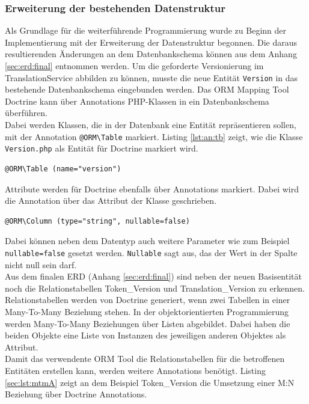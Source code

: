 \documentclass[10pt, oneside, ngerman]{article}
\begin{document}
  \subsubsection{Erweiterung der bestehenden Datenstruktur}\label{sec:impl:db}
    Als Grundlage für die weiterführende Programmierung wurde zu Beginn der Implementierung mit der Erweiterung der Datenstruktur begonnen. Die daraus resultierenden Änderungen an dem Datenbankschema können aus dem 
    Anhang \ref{sec:erd:final} entnommen werden.
    Um die geforderte Versionierung im TranslationService abbilden zu können, musste die neue Entität \lstinline{Version} in das bestehende Datenbankschema eingebunden werden.
    Das ORM Mapping Tool Doctrine kann über Annotations PHP-Klassen in ein Datenbankschema überführen.\\
    Dabei werden Klassen, die in der Datenbank eine Entität repräsentieren sollen, mit der Annotation \lstinline{@ORM\Table} markiert.
    Listing \ref{lst:an:tb} zeigt, wie die Klasse \lstinline{Version.php} als Entität für Doctrine markiert wird.
    \begin{lstlisting}[caption={Annotation für eine Entität},captionpos=b, label= lst:an:tb]
      @ORM\Table (name="version")
    \end{lstlisting}
    Attribute werden für Doctrine ebenfalls über Annotations markiert. Dabei wird die Annotation über das Attribut der Klasse geschrieben.
    \begin{lstlisting}[caption={Annotation für ein Attribut},captionpos=b, label= lst:an:at]
      @ORM\Column (type="string", nullable=false)
    \end{lstlisting} 
    Dabei können neben dem Datentyp auch weitere Parameter wie zum Beispiel \lstinline{nullable=false} gesetzt werden. \lstinline{Nullable} sagt aus, das der Wert in der Spalte 
    nicht null sein darf.\\
    Aus dem finalen ERD (Anhang \ref{sec:erd:final}) sind neben der neuen Basisentität noch die Relationstabellen Token\_Version und Translation\_Version zu erkennen. Relationstabellen werden von Doctrine generiert, wenn
    zwei Tabellen in einer Many-To-Many Beziehung stehen. In der objektorientierten Programmierung werden Many-To-Many Beziehungen über Listen abgebildet. Dabei haben die beiden
    Objekte eine Liste von Instanzen des jeweiligen anderen Objektes als Attribut.\\
    Damit das verwendente ORM Tool die Relationstabellen für die betroffenen Entitäten erstellen kann, werden weitere Annotations benötigt. Listing \ref{sec:lst:mtmA} zeigt an dem Beispiel Token\_Version die Umsetzung einer M:N Beziehung über Doctrine Annotations.
\end{document}
